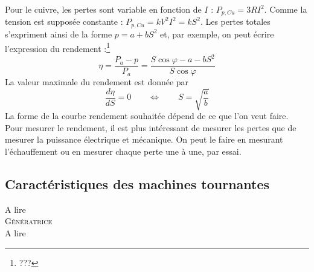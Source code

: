 	Pour le cuivre, les pertes sont variable en fonction de $I$ : $P_{p,Cu} = 3
	RI^2$. Comme la tension est supposée constante : $P_{p,Cu} = kV^2I^2 = kS^2$. 
	Les pertes totales s'expriment ainsi de la forme $p = a+bS^2$ et, par exemple, 
	on peut écrire l'expression du rendement :\footnote{???}
	\begin{equation}
	\eta = \frac{P_a-p}{P_a} = \dfrac{S\cos\varphi-a-bS^2}{S\cos\varphi}
	\end{equation}
	La valeur maximale du rendement est donnée par
	\begin{equation}
	\frac{d\eta}{dS} = 0\qquad \Leftrightarrow\qquad S = \sqrt{\frac{a}{b}}
	\end{equation}
	La forme de la courbe rendement souhaitée dépend de ce que l'on veut faire.\\
	Pour mesurer le rendement, il est plus intéressant de mesurer les pertes que 
	de mesurer la puissance électrique et mécanique. On peut le faire en mesurant 
	l'échauffement ou en mesurer chaque perte une à  une, par essai.
	
	
	\subsection{Caractéristiques des machines tournantes}
	A lire\\
	
	\textsc{Génératrice}\\
	A lire
		
		
		
		
		
		
		
		
		
		
		
		
		
		
